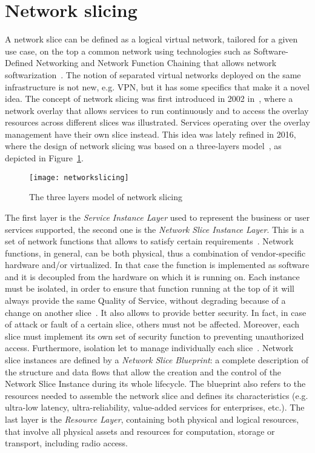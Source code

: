 \section{Network slicing}
A network slice can be defined as a logical virtual network, tailored for a
given use case, on the top a common network using technologies such as
Software-Defined Networking and Network Function Chaining that allows network
softwarization~\cite{ordonez2017network}. The notion of separated virtual
networks deployed on the same infrastructure is not new, e.g. VPN, but it has
some specifics that make it a novel idea. The concept of network slicing was
first introduced in 2002 in~\cite{peterson2003blueprint}, where a network 
overlay that allows services to run continuously and to access the overlay
resources across different slices was illustrated.
Services operating over the overlay management have their own slice instead.
This idea was lately refined in 2016, where the design of network slicing was
based on a three-layers model~\cite{alliance2016description}, as depicted in 
Figure~\ref{chap:background:img:network_slicing}.

\begin{figure}
  \centering
  \texttt{[image: networkslicing]}
  \caption{The three layers model of network
  slicing~\cite{alliance2016description}}
  \label{chap:background:img:network_slicing}
\end{figure}

The first layer is the \emph{Service Instance Layer} used to represent the
business or user services supported, the second one is the \emph{Network Slice
Instance Layer}. This is a set of network functions that allows to
satisfy certain requirements~\cite{kotulski2017end}. Network functions, in
general, can be both physical, thus a combination of vendor-specific hardware
and/or virtualized. In that case the function is implemented as software and it
is decoupled from the hardware on which it is running on. Each instance must be
isolated, in order to ensure that function running at the top of it will always
provide the same Quality of Service, without degrading because of a change on
another slice~\cite{richart2016resource}. It also allows to provide better
security. In fact, in case of attack or fault of a certain slice, others must
not be affected. Moreover, each slice must implement its own set of security
function to preventing unauthorized access. Furthermore, isolation let to
manage individually each slice~\cite{ordonez2017network}. Network slice
instances are defined by a \emph{Network Slice Blueprint}: a complete
description of the structure and data flows that allow the creation and the
control of the Network Slice Instance during its whole lifecycle. The blueprint
also refers to the resources needed to assemble the network slice and defines
its characteristics (e.g. ultra-low latency, ultra-reliability, value-added
services for enterprises, etc.). The last layer is the \emph{Resource Layer},
containing both physical and logical resources, that involve all physical
assets and resources for computation, storage or transport, including radio
access.


